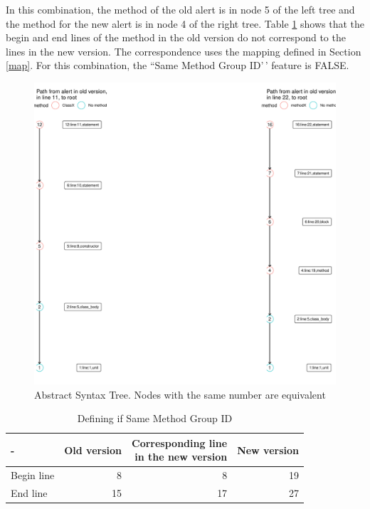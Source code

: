 \documentclass[
]{article}
\begin{document}
In this combination, the method of the old alert is in node 5 of the
left tree and the method for the new alert is in node 4 of the right
tree. Table \ref{tab_same_method} shows that the begin and end lines of
the method in the old version do not correspond to the lines in the new
version. The correspondence uses the mapping defined in Section
\ref{map}. For this combination, the ``Same Method Group ID'\,' feature
is FALSE.

\small

\begin{figure}[H]
\includegraphics[width=1\linewidth]{report_files/figure-latex/unnamed-chunk-8-1} \caption{Abstract Syntax Tree. Nodes with the same number are equivalent \label{path_node_to_root_1}}\label{fig:unnamed-chunk-8}
\end{figure}

\normalsize

\small

\begin{table}[H]

\caption{\label{tab:unnamed-chunk-9}Defining if Same Method Group ID \label{tab_same_method}}
\centering
\begin{tabular}[t]{l|r|r|r}
\hline
- & Old version & \makecell[l]{Corresponding line\\in the new version} & New version\\
\hline
Begin line & 8 & 8 & 19\\
\hline
End line & 15 & 17 & 27\\
\hline
\end{tabular}
\end{table}
\end{document}
